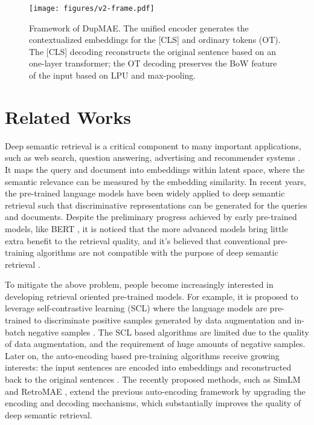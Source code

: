 \documentclass[11pt,a4paper]{article}
\begin{document}
\begin{figure*}[t]
\centering
\texttt{[image: figures/v2-frame.pdf]}
\vspace{-15pt}
\caption{Framework of DupMAE. The unified encoder generates the contextualized embeddings for the [CLS] and ordinary tokens (OT). The [CLS] decoding reconstructs the original sentence based on an one-layer transformer; the OT decoding preserves the BoW feature of the input based on LPU and max-pooling.}   
\vspace{-10pt}
\label{fig:2}
\end{figure*} 




\section{Related Works}


Deep semantic retrieval is a critical component to many important applications, such as web search, question answering, advertising and recommender systems \cite{karpukhin2020dense,zhang2022uni,xiao2022training}. It maps the query and document into embeddings within latent space, where the semantic relevance can be measured by the embedding similarity. In recent years, the pre-trained language models have been widely applied to deep semantic retrieval such that discriminative representations can be generated for the queries and documents. Despite the preliminary progress achieved by early pre-trained models, like BERT \cite{Devlin2019BERT}, it is noticed that the more advanced models bring little extra benefit to the retrieval quality, and it's believed that conventional pre-training algorithms are not compatible with the purpose of deep semantic retrieval \cite{gao2021condenser,lu2021less,wang2022simlm}. 

To mitigate the above problem, people become increasingly interested in developing retrieval oriented pre-trained models. For example, it is proposed to leverage self-contrastive learning (SCL) where the language models are pre-trained to discriminate positive samples generated by data augmentation and in-batch negative samples \cite{chang2020pre,guu2020realm,izacard2021towards}. The SCL based algorithms are limited due to the quality of data augmentation, and the requirement of huge amounts of negative samples. Later on, the auto-encoding based pre-training algorithms receive growing interests: the input sentences are encoded into embeddings and reconstructed back to the original sentences \cite{lu2021less,wang2021tsdae}. The recently proposed methods, such as SimLM \cite{wang2022simlm} and RetroMAE \cite{liu2022retromae}, extend the previous auto-encoding framework by upgrading the encoding and decoding mechanisms, which substantially improves the quality of deep semantic retrieval. 
\end{document}
